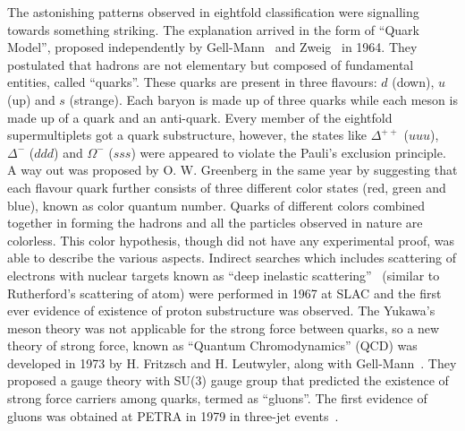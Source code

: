 The astonishing patterns observed in eightfold classification were signalling towards something striking. The explanation arrived in the form of ``Quark Model'',
proposed independently by Gell-Mann~\cite{GellMann:1964nj} and Zweig~\cite{Zweig:570209} in 1964.
They postulated that hadrons are not elementary but composed of fundamental entities, called ``quarks''.
These quarks are present in three flavours: $d$ (down), $u$ (up) and $s$ (strange). Each baryon is made up of three quarks while each meson is made up
of a quark and an anti-quark. Every member of the eightfold supermultiplets
got a quark substructure, however, the states like $\Delta^{++}$ ($uuu$), $\Delta^{-}$ ($ddd$) and $\Omega^{-}$ ($sss$) were appeared to violate the Pauli's exclusion
principle. A way out was proposed by O. W. Greenberg in the
same year by suggesting that each flavour quark further consists of three different color states (red, green and blue), known as color quantum number.
Quarks of different colors combined together in forming the hadrons and all the particles observed in nature are colorless.
This color hypothesis, though did not have any experimental proof, was able to describe the various aspects. 
Indirect searches which includes scattering of electrons with nuclear targets known as ``deep inelastic scattering''~\cite{dokshitzer1977calculation}
(similar to Rutherford's scattering of atom)
were performed in 1967 at SLAC and the first ever evidence of existence of proton substructure was observed.
The Yukawa's meson theory was not applicable for the strong force between quarks, so a new theory of strong force,
known as ``Quantum Chromodynamics'' (QCD) was developed in 1973 by H. Fritzsch and H. Leutwyler, along
with Gell-Mann~\cite{Fritzsch:1973pi}.
They proposed a gauge theory with SU(3) gauge group that predicted the existence of strong force carriers among quarks, termed as ``gluons''. The
first evidence of gluons was obtained at PETRA in 1979 in three-jet events~\cite{Gluons1979}. 

